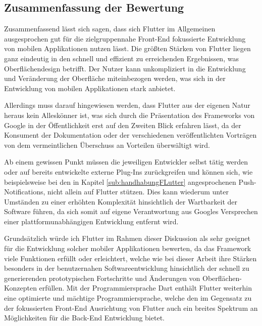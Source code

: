 \documentclass[bibliography=totoc,listof=totoc,BCOR=5mm,DIV=12,oneside]{scrbook}
\begin{document}
\subsection{Zusammenfassung der Bewertung}
\par Zusammenfassend lässt sich sagen, dass sich Flutter im Allgemeinen ausgesprochen gut für die zielgruppennahe Front-End fokussierte Entwicklung von mobilen Applikationen nutzen lässt. Die größten Stärken von Flutter liegen ganz eindeutig in den schnell und effizient zu erreichenden Ergebnissen, was Oberflächendesign betrifft. Der Nutzer kann unkompliziert in die Entwicklung und Veränderung der Oberfläche miteinbezogen werden, was sich in der Entwicklung von mobilen Applikationen stark anbietet. 
\par \bigskip Allerdings muss darauf hingewiesen werden, dass Flutter aus der eigenen Natur heraus kein Alleskönner ist, was sich durch die Präsentation des Frameworks von Google in der Öffentlichkeit erst auf den Zweiten Blick erfahren lässt, da der Konsument der Dokumentation oder der verschiedenen veröffentlichten Vorträgen von dem vermeintlichen Überschuss an Vorteilen überwältigt wird.

\par \bigskip Ab einem gewissen Punkt müssen die jeweiligen Entwickler selbst tätig werden oder auf bereits entwickelte externe Plug-Ins zurückgreifen und können sich, wie beispielsweise bei den in Kapitel \ref{sub:handhabungFLutter} angesprochenen Push-Notifications, nicht allein auf Flutter stützen. Dies kann wiederum unter Umständen zu einer erhöhten Komplexität hinsichtlich der Wartbarkeit der Software führen, da sich somit auf eigene Verantwortung aus Googles Versprechen einer plattformunabhängigen Entwicklung entfernt wird.

\par \bigskip Grundsätzlich würde ich Flutter im Rahmen dieser Diskussion als sehr geeignet für die Entwicklung solcher mobiler Applikationen bewerten, da das Framework viele Funktionen erfüllt oder erleichtert, welche wie bei dieser Arbeit ihre Stärken besonders in der benutzernahen Softwareentwicklung hinsichtlich der schnell zu generierenden prototypischen Fortschritte und Änderungen von Oberflächen-Konzepten erfüllen. Mit der Programmiersprache Dart enthält Flutter weiterhin eine optimierte und mächtige Programmiersprache, welche den im Gegensatz zu der fokussierten Front-End Ausrichtung von Flutter auch ein breites Spektrum an Möglichkeiten für die Back-End Entwicklung bietet.
\end{document}
